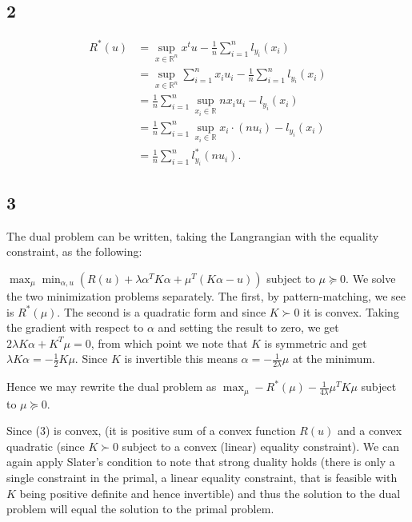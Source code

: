 \documentclass[12pt]{article}
\begin{document}
\subsection{2}
\begin{align*} R^*(u) &= \sup_{x \in \mathbb{R}^n} x^t u - \frac{1}{n} \sum_{i=1}^n l_{y_i}(x_i) \\
	& = \sup_{x \in \mathbb{R}^n} \sum_{i=1}^n x_i u_i - \frac{1}{n} \sum_{i=1}^n l_{y_i}(x_i) \\
	& = \frac{1}{n} \sum_{i=1}^n \sup_{x_i \in \mathbb{R}} nx_i u_i  - l_{y_i}(x_i) \\
	& = \frac{1}{n} \sum_{i=1}^n \sup_{x_i\in \mathbb{R}} x_i \cdot (nu_i) - l_{y_i}(x_i) \\
	& =  \frac{1}{n} \sum_{i=1}^n l^*_{y_i}(nu_i).
\end{align*}
\subsection{3}
The dual problem can be written, taking the Langrangian with the equality constraint, as the following:

$\max_{\mu} \min_{\alpha, u} (R(u) + \lambda \alpha^T K \alpha + \mu^T(K\alpha -u))$ subject to $\mu \succeq 0$. We solve the two minimization problems separately. The first, by pattern-matching, we see is $R^*(\mu)$. The second is a quadratic form and since $K \succ 0$ it is convex. Taking the gradient with respect to $\alpha$ and setting the result to zero, we get $2 \lambda K\alpha + K^T \mu = 0$, from which point we note that $K$ is symmetric and get $ \lambda K \alpha = -\frac{1}{2} K \mu$. Since $K$ is invertible this means $\alpha = -\frac{1}{2 \lambda} \mu$ at the minimum.

Hence we may rewrite the dual problem as $\max_{\mu} -R^*(\mu) -\frac{1}{4\lambda} \mu^T K \mu$ subject to $\mu \succeq 0$.

Since (3) is convex, (it is positive sum of a convex function $R(u)$ and a convex quadratic (since $K \succ 0$ subject to a convex (linear) equality constraint). We can again apply Slater's condition to note that strong duality holds (there is only a single constraint in the primal, a linear equality constraint, that is feasible with $K$ being positive definite and hence invertible) and thus the solution to the dual problem will equal the solution to the primal problem.
\end{document}
